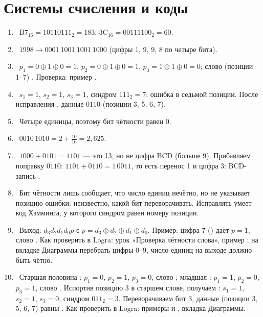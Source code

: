 \section*{Системы счисления и коды}
\begin{enumerate}
  \item {}~$\text{B7}_{16}=10110111_2=183$; $\text{3C}_{16}=00111100_2=60$.
  \item {}~$1998 \to 0001\ 1001\ 1001\ 1000$ (цифры 1, 9, 9, 8 по четыре бита).
  \item {}~$p_1=0\oplus1\oplus0=1$, $p_2=0\oplus1\oplus0=1$, $p_3=1\oplus1\oplus0=0$; слово (позиции 1--7) . Проверка: пример .
  \item {}~$s_1=1$, $s_2=1$, $s_3=1$, синдром $111_2=7$: ошибка в седьмой позиции. После исправления , данные $0110$ (позиции 3, 5, 6, 7).
  \item {}~Четыре единицы, поэтому бит чётности равен 0.
  \item {}~$0010\,1010 = 2 + \tfrac{10}{16} = 2{,}625$.
  \item {}~$1000+0101=1101$ --- это 13, но не цифра BCD (больше 9). Прибавляем поправку $0110$: $1101+0110=1\,0011$, то есть перенос 1 и цифра 3: BCD-запись .
  \item {}~Бит чётности лишь сообщает, что число единиц нечётно, но не указывает позицию ошибки: неизвестно, какой бит переворачивать. Исправлять умеет код Хэмминга, у которого синдром равен номеру позиции.
  \item {}~Выход: $d_3d_2d_1d_0p$ с $p=d_3\oplus d_2\oplus d_1\oplus d_0$. Пример: цифра 7 () даёт $p=1$, слово . Как проверить в Logra: урок «Проверка чётности слова», пример ; на вкладке Диаграммы перебрать цифры 0--9, число единиц на выходе должно быть чётно.
  \item {}~Старшая половина : $p_1=0$, $p_2=1$, $p_3=0$, слово ; младшая : $p_1=1$, $p_2=0$, $p_3=1$, слово . Испортив позицию 3 в старшем слове, получаем : $s_1=1$, $s_2=1$, $s_3=0$, синдром $011_2=3$. Переворачиваем бит 3, данные (позиции 3, 5, 6, 7) равны . Как проверить в Logra: примеры  и , вкладка Диаграммы.
\end{enumerate}

